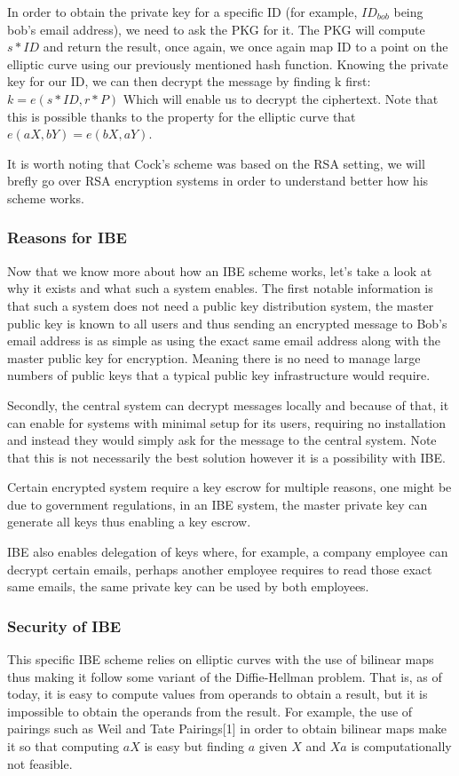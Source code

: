 \documentclass[conference]{IEEEtran}
\begin{document}
In order to obtain the private key for a specific ID (for example, $ID_{bob}$ being bob's email address),
we need to ask the PKG for it. The PKG will
compute $s*ID$ and return the result, once again, we once again map ID to a point on the elliptic curve
using our previously mentioned hash function.
Knowing the private key for our ID, we can then decrypt 
the message by finding k first: $k = e(s*ID, r*P)$ Which will enable us to decrypt the 
ciphertext.
Note that this is possible thanks to the property for the elliptic curve that 
$e(aX, bY) = e(bX, aY)$.


It is worth noting that Cock's scheme was based on the RSA setting, we will brefly
go over RSA encryption systems in order to understand better how his scheme works.


\subsubsection{Reasons for IBE}
Now that we know more about how an IBE scheme works, let's take a look at why it exists and
what such a system enables. The first notable information is that such a system
does not need a public key distribution system, the master public key is known to all
users and thus sending an encrypted message to Bob's email address is as simple
as using the exact same email address along with the master public key for encryption. 
Meaning there is no need to manage large numbers of public keys that a typical
public key infrastructure would require.

Secondly, the central system can decrypt messages locally and because of that,
it can enable for systems with minimal setup for its users, requiring no installation 
and instead they would simply ask for the message to the central system. Note that this 
is not necessarily the best solution however it is a possibility with IBE.


Certain encrypted system require a key escrow for multiple reasons, one might be 
due to government regulations, in an IBE system, the master private key can 
generate all keys thus enabling a key escrow.

IBE also enables delegation of keys where, for example, a company employee can decrypt certain 
emails, perhaps another employee requires to read those exact same emails, the same 
private key can be used by both employees.

\subsubsection{Security of IBE}
This specific IBE scheme relies on elliptic curves with the use of 
bilinear maps thus making it follow some variant of the Diffie-Hellman problem.
That is, as of today, it is easy to compute values from operands to obtain a result,
but it is impossible to obtain the operands from the result.
For example, the use of pairings such as Weil and Tate Pairings[1] in order 
to obtain bilinear maps make it so that computing $aX$ is easy but finding $a$ 
given $X$ and $Xa$ is computationally not feasible.
\end{document}
